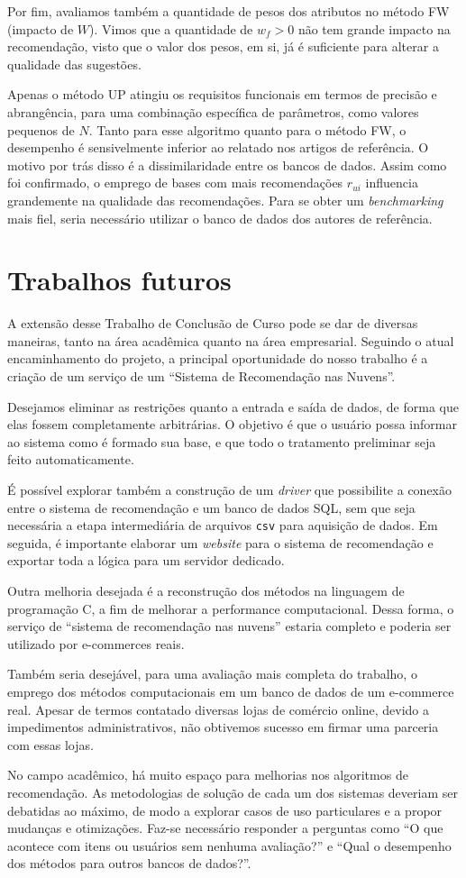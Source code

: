 Por fim, avaliamos também a quantidade de pesos dos atributos no método FW (impacto de $W$). Vimos que a quantidade de $w_f>0$ não tem grande impacto na recomendação, visto que o valor dos pesos, em si, já é suficiente para alterar a qualidade das sugestões.

Apenas o método UP atingiu os requisitos funcionais em termos de precisão e abrangência, para uma combinação específica de parâmetros, como valores pequenos de $N$. Tanto para esse algoritmo quanto para o método FW, o desempenho é sensivelmente inferior ao relatado nos artigos de referência. O motivo por trás disso é a dissimilaridade entre os bancos de dados. Assim como foi confirmado, o emprego de bases com mais recomendações $r_{ui}$ influencia grandemente na qualidade das recomendações. Para se obter um \textit{benchmarking} mais fiel, seria necessário utilizar o banco de dados dos autores de referência.  

\section{Trabalhos futuros} %
\label{sec:trabalhos_futuros}

A extensão desse Trabalho de Conclusão de Curso pode se dar de diversas maneiras, tanto na área acadêmica quanto na área empresarial. Seguindo o atual encaminhamento do projeto, a principal oportunidade do nosso trabalho é a criação de um serviço de um ``Sistema de Recomendação nas Nuvens''. 

Desejamos eliminar as restrições quanto a entrada e saída de dados, de forma que elas fossem completamente arbitrárias. O objetivo é que o usuário possa informar ao sistema como é formado sua base, e que todo o tratamento preliminar seja feito automaticamente. 

É possível explorar também a construção de um \textit{driver} que possibilite a conexão entre o sistema de recomendação e um banco de dados SQL, sem que seja necessária a etapa intermediária de arquivos \texttt{csv} para aquisição de dados. Em seguida, é importante elaborar um \textit{website} para o sistema de recomendação e exportar toda a lógica para um servidor dedicado. 

Outra melhoria desejada é a reconstrução dos métodos na linguagem de programação C, a fim de melhorar a performance computacional. Dessa forma, o serviço de ``sistema de recomendação nas nuvens'' estaria completo e poderia ser utilizado por e-commerces reais.

Também seria desejável, para uma avaliação mais completa do trabalho, o emprego dos métodos computacionais em um banco de dados de um e-commerce real. Apesar de termos contatado diversas lojas de comércio online, devido a impedimentos administrativos, não obtivemos sucesso em firmar uma parceria com essas lojas. 

No campo acadêmico, há muito espaço para melhorias nos algoritmos de recomendação. As metodologias de solução de cada um dos sistemas deveriam ser debatidas ao máximo, de modo a explorar casos de uso particulares e a propor mudanças e otimizações. Faz-se necessário responder a perguntas como ``O que acontece com itens ou usuários sem nenhuma avaliação?'' e ``Qual o desempenho dos métodos para outros bancos de dados?''. 